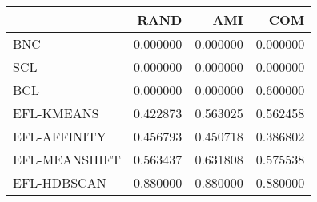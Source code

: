 \begin{tabular}{lrrr}
\toprule
 & RAND & AMI & COM \\
\midrule
BNC & 0.000000 & 0.000000 & 0.000000 \\
SCL & 0.000000 & 0.000000 & 0.000000 \\
BCL & 0.000000 & 0.000000 & 0.600000 \\
EFL-KMEANS & 0.422873 & 0.563025 & 0.562458 \\
EFL-AFFINITY & 0.456793 & 0.450718 & 0.386802 \\
EFL-MEANSHIFT & 0.563437 & 0.631808 & 0.575538 \\
EFL-HDBSCAN & 0.880000 & 0.880000 & 0.880000 \\
\bottomrule
\end{tabular}
